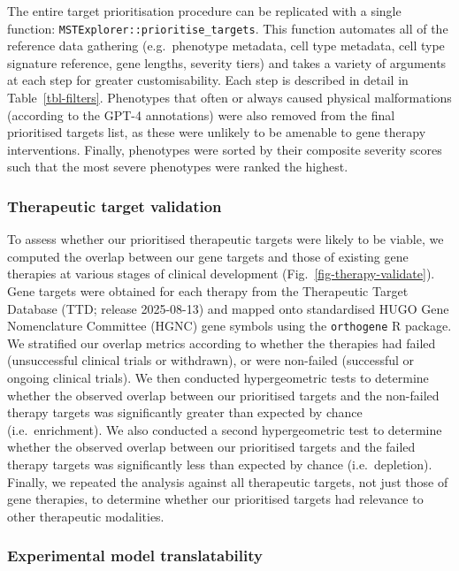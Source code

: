 \documentclass[
]{article}
\begin{document}
The entire target prioritisation procedure can be replicated with a
single function: \texttt{MSTExplorer::prioritise\_targets}. This
function automates all of the reference data gathering (e.g.~phenotype
metadata, cell type metadata, cell type signature reference, gene
lengths, severity tiers) and takes a variety of arguments at each step
for greater customisability. Each step is described in detail in
Table~\ref{tbl-filters}. Phenotypes that often or always caused physical
malformations (according to the GPT-4 annotations) were also removed
from the final prioritised targets list, as these were unlikely to be
amenable to gene therapy interventions. Finally, phenotypes were sorted
by their composite severity scores such that the most severe phenotypes
were ranked the highest.

\subsubsection{Therapeutic target
validation}\label{therapeutic-target-validation-1}

To assess whether our prioritised therapeutic targets were likely to be
viable, we computed the overlap between our gene targets and those of
existing gene therapies at various stages of clinical development
(Fig.~\ref{fig-therapy-validate}). Gene targets were obtained for each
therapy from the Therapeutic Target Database (TTD; release 2025-08-13)
and mapped onto standardised HUGO Gene Nomenclature Committee (HGNC)
gene symbols using the \texttt{orthogene} R package. We stratified our
overlap metrics according to whether the therapies had failed
(unsuccessful clinical trials or withdrawn), or were non-failed
(successful or ongoing clinical trials). We then conducted
hypergeometric tests to determine whether the observed overlap between
our prioritised targets and the non-failed therapy targets was
significantly greater than expected by chance (i.e.~enrichment). We also
conducted a second hypergeometric test to determine whether the observed
overlap between our prioritised targets and the failed therapy targets
was significantly less than expected by chance (i.e.~depletion).
Finally, we repeated the analysis against all therapeutic targets, not
just those of gene therapies, to determine whether our prioritised
targets had relevance to other therapeutic modalities.

\subsubsection{Experimental model
translatability}\label{experimental-model-translatability}
\end{document}
